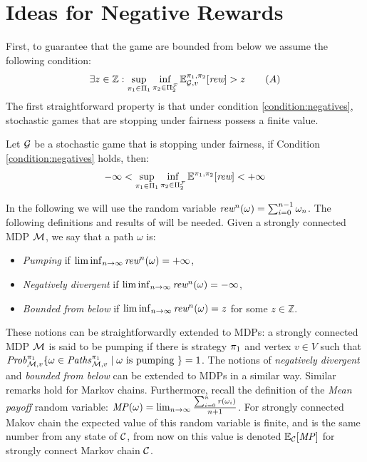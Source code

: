 

\iffalse

\section{Ideas for Negative Rewards}
	First, to guarantee that the game are bounded from below we assume the following condition:
\[
	\exists z \in \mathbb{Z} : \sup_{\pi_{1} \in \Pi_{1}} \inf_{\pi_{2} \in \Pi^{\mathcal{F}}_{2}} \mathbb{E}^{\pi_{1}, \pi_{2}}_{\mathcal{G},v}[\textit{rew}] >z \tag{$A$} \label{condition:negatives}
\]
	The first straightforward property is that under condition \ref{condition:negatives}, stochastic games that are stopping under fairness possess a finite value.
\begin{theorem} Let $\mathcal{G}$ be a stochastic game that is stopping under fairness, if Condition \ref{condition:negatives} holds, then:
\[
	-\infty < \sup_{\pi_{1} \in \Pi_{1}} \inf_{\pi_{2} \in \Pi^{\mathcal{F}}_{2}} \mathbb{E}^{\pi_{1}, \pi_{2}}[\textit{rew}] < + \infty
\]
\end{theorem}
	In the following we will use the random variable $\textit{rew}^n(\omega) = \sum^{n-1}_{i=0} \omega_n$.  The following definitions and  results of \cite{DBLP:conf/lics/Baier0DGS18} will be needed. 
	Given a strongly connected MDP $\mathcal{M}$, we say that a path $\omega$ is:
\begin{itemize}
	\item \emph{Pumping} if $\liminf_{n \to \infty} \textit{rew}^n(\omega) = +\infty$,
	\item \emph{Negatively divergent} if $\liminf_{n \to \infty} \textit{rew}^n(\omega) = -\infty$,
	\item \emph{Bounded from below} if $\liminf_{n \to \infty} \textit{rew}^n(\omega) = z$ for some $z \in \mathbb{Z}$.
\end{itemize}
	These notions can be straightforwardly extended to MDPs: a strongly connected MDP $\mathcal{M}$ is said to be 
pumping if there is strategy $\pi_{1}$ and vertex $v \in V$ such that $\mathit{Prob}^{\pi_{1}}_{\mathcal{M},v} \{ \omega \in \mathit{Paths}^{\pi_{1}}_{\mathcal{M}, v} \mid \omega \text{ is pumping }\} = 1$. 
The notions of \emph{negatively divergent} and \emph{bounded from below} can be extended to MDPs in a similar way. Similar remarks hold for Markov chains. Furthermore, recall the definition of 
the \emph{Mean payoff} random variable: $\mathit{MP}(\omega) = \lim_{n \to \infty} \frac{\sum^n_{i=0} \mathit{r}(\omega_i)}{n+1}$. For strongly connected Makov chain the expected value of this random variable is finite, and is the same number from any state of $\mathcal{C}$, from now on this value is denoted $\mathbb{E}_{\mathcal{C}}[\mathit{MP}]$ for strongly connect Markov chain $\mathcal{C}$.

